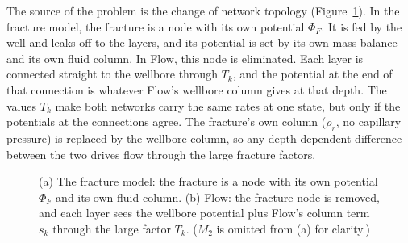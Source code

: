 \documentclass[11pt,a4paper]{article}
\newcommand{\Phiw}{\Phi_w}
\newcommand{\PhiF}{\Phi_F}
\begin{document}
The source of the problem is the change of network topology (Figure~\ref{fig:circuit}).  In
the fracture model, the fracture is a node with its own potential $\PhiF$.  It is fed by the
well and leaks off to the layers, and its potential is set by its own mass balance and its own
fluid column.  In Flow, this node is eliminated.  Each layer is connected straight to the
wellbore through $T_k$, and the potential at the end of that connection is whatever Flow's
wellbore column gives at that depth.  The values $T_k$ make both networks carry the same rates
at one state, but only if the potentials at the connections agree.  The fracture's own column
($\rho_r$, no capillary pressure) is replaced by the wellbore column, so any depth-dependent
difference between the two drives flow through the large fracture factors.

\begin{figure}[ht]
\centering
{}
\caption{(a) The fracture model: the fracture is a node with its own potential $\PhiF$ and its
own fluid column.  (b) Flow: the fracture node is removed, and each layer sees the wellbore
potential plus Flow's column term $s_k$ through the large factor $T_k$.  ($M_2$ is omitted
from (a) for clarity.)}
\label{fig:circuit}
\end{figure}
\end{document}
